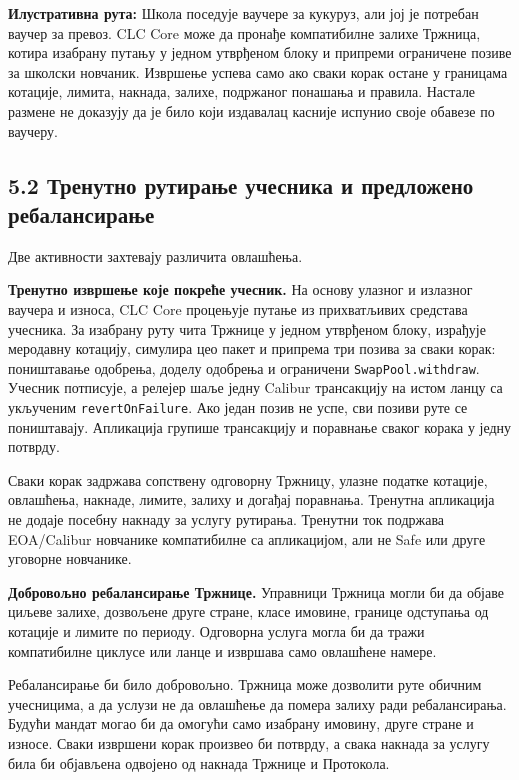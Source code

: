 \documentclass[11pt]{article}
\begin{document}
\textbf{Илустративна рута:} Школа поседује ваучере за кукуруз, али јој је потребан ваучер за превоз. CLC Core може да пронађе компатибилне залихе Тржница, котира изабрану путању у једном утврђеном блоку и припреми ограничене позиве за школски новчаник. Извршење успева само ако сваки корак остане у границама котације, лимита, накнада, залихе, подржаног понашања и правила. Настале размене не доказују да је било који издавалац касније испунио своје обавезе по ваучеру.

\subsection*{5.2 Тренутно рутирање учесника и предложено ребалансирање}

Две активности захтевају различита овлашћења.

\textbf{Тренутно извршење које покреће учесник.} На основу улазног и излазног ваучера и износа, CLC Core процењује путање из прихватљивих средстава учесника. За изабрану руту чита Тржнице у једном утврђеном блоку, израђује меродавну котацију, симулира цео пакет и припрема три позива за сваки корак: поништавање одобрења, доделу одобрења и ограничени \texttt{SwapPool.withdraw}. Учесник потписује, а релејер шаље једну Calibur трансакцију на истом ланцу са укљученим \texttt{revertOnFailure}. Ако један позив не успе, сви позиви руте се поништавају. Апликација групише трансакцију и поравнање сваког корака у једну потврду.

Сваки корак задржава сопствену одговорну Тржницу, улазне податке котације, овлашћења, накнаде, лимите, залиху и догађај поравнања. Тренутна апликација не додаје посебну накнаду за услугу рутирања. Тренутни ток подржава EOA/Calibur новчанике компатибилне са апликацијом, али не Safe или друге уговорне новчанике.

\textbf{Добровољно ребалансирање Тржнице.} Управници Тржница могли би да објаве циљеве залихе, дозвољене друге стране, класе имовине, границе одступања од котације и лимите по периоду. Одговорна услуга могла би да тражи компатибилне циклусе или ланце и извршава само овлашћене намере.

Ребалансирање би било добровољно. Тржница може дозволити руте обичним учесницима, а да услузи не да овлашћење да помера залиху ради ребалансирања. Будући мандат могао би да омогући само изабрану имовину, друге стране и износе. Сваки извршени корак произвео би потврду, а свака накнада за услугу била би објављена одвојено од накнада Тржнице и Протокола.
\end{document}
